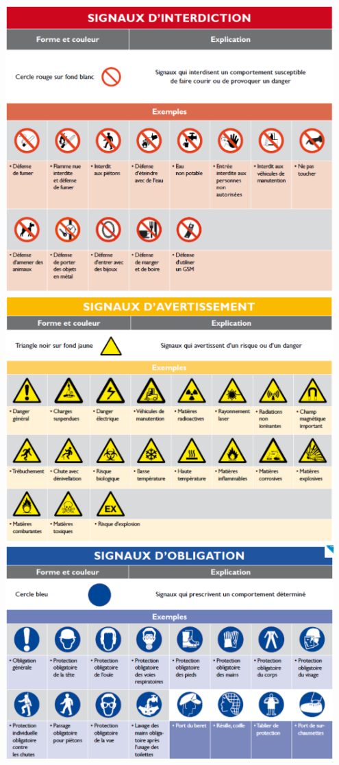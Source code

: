 \documentclass[a4paper]{article}
\begin{document}
\begin{center}
\includegraphics[width=0.95\textwidth]{images/signaux1.PNG}
\includegraphics[width=0.95\textwidth]{images/signaux2.PNG}
\includegraphics[width=0.95\textwidth]{images/signaux3.PNG}

\end{center}
\end{document}
